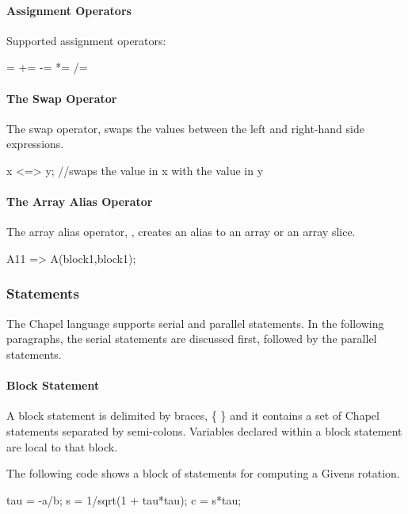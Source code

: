 \paragraph{Assignment Operators}
Supported assignment operators:
\begin{chapel}
 = += -= *= /= %
\end{chapel}

\paragraph{The Swap Operator}
The swap operator, \chpl{<=>} swaps the values between
the left and right-hand side expressions.
\begin{chapel}
x <=> y; //swaps the value in x with the value in y
\end{chapel}

\paragraph{The Array Alias Operator}
The array alias operator, \chpl{=>}, creates an alias
to an array or an array slice.
\begin{chapel}
A11 => A(block1,block1);
\end{chapel}


\subsubsection{Statements}
The Chapel language supports serial and parallel statements.  In the
following paragraphs, the serial statements are discussed first, followed
by the parallel statements.

\paragraph{Block Statement}  
A block statement is delimited by braces, \{ \} and it
contains a set of Chapel statements separated by semi-colons.  
Variables declared within a block statement are local to that block.

\begin{example}
The following code shows a block of statements for computing
a Givens rotation.
\begin{chapel}
{
tau = -a/b;
s = 1/sqrt(1 + tau*tau);
c = s*tau;
}
\end{chapel} 
\end{example} 

